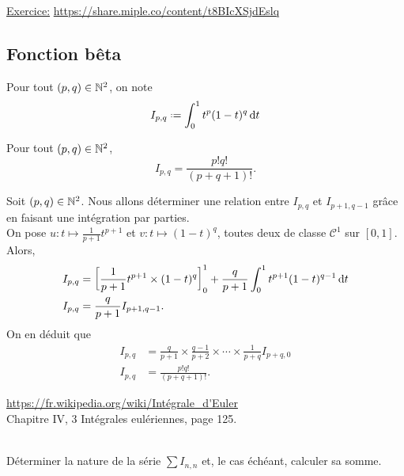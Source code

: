 \underline{Exercice:} \url{https://share.miple.co/content/t8BIcXSjdEslq}

\subsection{Fonction bêta}
\begin{defi}
    Pour tout $(p,q) \in \mathbb{N}^2$, on note
    $$I_{p,q} \defeq \int_{0}^{1} t^p (1-t)^q \d t$$
\end{defi}

\begin{prop}
    Pour tout $(p,q) \in \mathbb{N}^2$,
    $$I_{p,q} = \frac{p! q!}{(p + q + 1)!}.$$
\end{prop}

\begin{preuve}
    Soit $(p,q) \in \mathbb{N}^2$. Nous allons déterminer une relation entre $I_{p,q}$ et $I_{p+1, q-1}$ grâce en faisant une intégration par parties. \\
    On pose $u:t\mapsto \frac{1}{p+1} t^{p+1}$ et $v:t\mapsto (1-t)^q$, toutes deux de classe $\mathscr{C}^1$ sur $[0, 1]$. Alors, 
    \begin{align*}
        I_{p,q} &= \left[ \frac{1}{p+1}t^{p+1} \times (1-t)^q \right]_0^1 + \frac{q}{p+1} \int_0^1 t^{p+1} (1-t)^{q-1} \, \mathrm{d} t \\
        I_{p,q} &= \frac{q}{p+1} I_{p+1, q-1}.
    \end{align*}
    On en déduit que 
    \begin{align*}
        I_{p,q} &= \frac{q}{p+1} \times \frac{q-1}{p+2} \times \cdots \times \frac{1}{p+q} I_{p+q,0} \\
        I_{p,q} &= \frac{p! q!}{(p + q + 1)!}.
    \end{align*}
\end{preuve}

\url{https://fr.wikipedia.org/wiki/Intégrale_d'Euler} \\
\cite{calcul_infinitesimal} Chapitre IV, 3 Intégrales eulériennes, page 125.

\begin{exercice}
    \cite{acamanes} \\
    Déterminer la nature de la série $\sum I_{n,n}$ et, le cas échéant, calculer sa somme. 
\end{exercice}

\begin{solution}
\end{solution}
